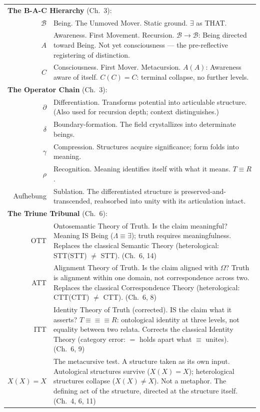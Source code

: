 \documentclass[10pt, openany, oneside]{book}
\renewcommand{\footnotesize}{\fontsize{8.5}{11}\selectfont}
\begin{document}
{\footnotesize
\noindent\begin{tabular}{@{} r @{\hspace{0.6em}} p{} @{}}
\multicolumn{2}{l}{\textbf{The B-A-C Hierarchy} (Ch.\ 3):} \\[0.3em]
$\mathcal{B}$ & Being. The Unmoved Mover. Static ground. $\exists$ as THAT. \\[0.3em]
$A$ & Awareness. First Movement. Recursion. $\mathcal{B} \to \mathcal{B}$: Being directed toward Being. Not yet consciousness --- the pre-reflective registering of distinction. \\[0.3em]
$C$ & Consciousness. First Mover. Metacursion. $A(A)$: Awareness aware of itself. $C(C) = C$: terminal collapse, no further levels. \\[0.3em]
\multicolumn{2}{l}{\textbf{The Operator Chain} (Ch.\ 3):} \\[0.3em]
$\partial$ & Differentiation. Transforms potential into articulable structure. (Also used for recursion depth; context distinguishes.) \\[0.3em]
$\delta$ & Boundary-formation. The field crystallizes into determinate beings. \\[0.3em]
$\gamma$ & Compression. Structures acquire significance; form folds into meaning. \\[0.3em]
$\rho$ & Recognition. Meaning identifies itself with what it means. $T \equiv R$. \\[0.3em]
Aufhebung & Sublation. The differentiated structure is preserved-and-transcended, reabsorbed into unity with its articulation intact. \\[0.3em]
\multicolumn{2}{l}{\textbf{The Triune Tribunal} (Ch.\ 6):} \\[0.3em]
OTT & Ontosemantic Theory of Truth. Is the claim meaningful? Meaning IS Being ($\Lambda \equiv \exists$); truth requires meaningfulness. Replaces the classical Semantic Theory (heterological: STT(STT) $\neq$ STT). (Ch.\ 6, 14) \\[0.3em]
ATT & Alignment Theory of Truth. Is the claim aligned with $\Omega$? Truth is alignment within one domain, not correspondence across two. Replaces the classical Correspondence Theory (heterological: CTT(CTT) $\neq$ CTT). (Ch.\ 6, 8) \\[0.3em]
ITT & Identity Theory of Truth (corrected). IS the claim what it asserts? $T \equiv\!\equiv\!\equiv R$: ontological identity at three levels, not equality between two relata. Corrects the classical Identity Theory (category error: $=$ holds apart what $\equiv$ unites). (Ch.\ 6, 9) \\[0.3em]
$X(X) = X$ & The metacursive test. A structure taken as its own input. Autological structures survive ($X(X) = X$); heterological structures collapse ($X(X) \neq X$). Not a metaphor. The defining act of the structure, directed at the structure itself. (Ch.\ 4, 6, 11) \\[0.3em]
\end{tabular}
}
\end{document}

